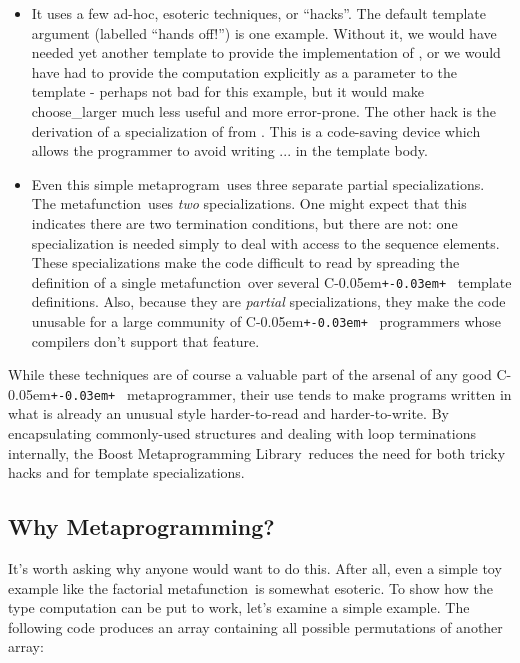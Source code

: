 \documentclass{kapproc}
\newcommand{\Cpp}{C\kern-0.05em\texttt{+\kern-0.03em+}%
}
\newcommand{\Mpl}{Boost Meta\-pro\-gram\-ming Library}
\newcommand{\mpgm}{meta\-pro\-gram}
\newcommand{\mpgmer}{meta\-pro\-gram\-mer}
\newcommand{\mfn}{meta\-func\-tion}
\begin{document}
\begin{itemize}
\item It uses a few ad-hoc, esoteric techniques, or ``hacks''. The
  default template argument  (labelled ``hands off!'')
  is one example. Without it, we would have needed yet another
  template to provide the implementation of ,
  or we would have had to provide the computation explicitly as a
  parameter to the template - perhaps not bad for this example, but it
  would make choose\_\-larger much less useful and more
  error-prone. The other hack is the derivation of a specialization of
   from . This is a code-saving
  device which allows the programmer to avoid writing ... in the template body.

\item Even this simple \mpgm\ uses three separate partial
  specializations. The  \mfn\ uses \emph{two}
  specializations. One might expect that this indicates there are two
  termination conditions, but there are not: one specialization is
  needed simply to deal with access to the sequence elements. These
  specializations make the code difficult to read by spreading the
  definition of a single \mfn\ over several \Cpp\ template
  definitions. Also, because they are \emph{partial} specializations,
  they make the code unusable for a large community of \Cpp\
  programmers whose compilers don't support that feature.
\end{itemize}

While these techniques are of course a valuable part of the arsenal of
any good \Cpp\ \mpgmer, their use tends to make programs written in
what is already an unusual style harder-to-read and
harder-to-write. By encapsulating commonly-used structures and dealing
with loop terminations internally, the \Mpl\ reduces the need for both
tricky hacks and for template specializations.

\subsection{Why Metaprogramming?}


It's worth asking why anyone would want to do this. After all, even a
simple toy example like the factorial \mfn\ is somewhat
esoteric. To show how the type computation can be put to work, let's
examine a simple example. The following code produces an array
containing all possible permutations of another array:
\end{document}
